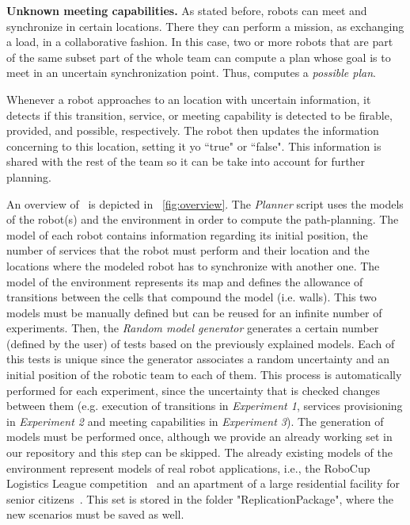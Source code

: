 \textbf{Unknown meeting capabilities.} 
As stated before, robots can meet and synchronize in certain locations.
There they can perform a mission, as exchanging a load, in a collaborative fashion.
In this case, two or more robots that are part of the same subset part of the whole team can compute a plan whose goal is to meet in an uncertain synchronization point.
Thus, \toolName computes a \emph{possible plan}.

Whenever a robot approaches to an location with uncertain information, it detects if this transition, service, or meeting capability is detected to be firable, provided, and possible, respectively.
The robot then updates the information concerning to this location, setting it yo ``true" or ``false".
This information is shared with the rest of the team so it can be take into account for further planning.

An overview of \toolName\ is depicted in ~\ref{fig:overview}.
The \emph{Planner} script uses the models of the robot(s) and the environment in order to compute the path-planning.
The model of each robot contains information regarding its initial position, the number of services that the robot must perform and their location and the locations where the modeled robot has to synchronize with another one.  
The model of the environment represents its map and defines the allowance of transitions between the cells that compound the model (i.e. walls). 
This two models must be manually defined but can be reused for an infinite number of experiments.
Then, the \emph{Random model generator} generates a certain number (defined by the user) of tests based on the previously explained models.
Each of this tests is unique since the generator associates a random uncertainty and an initial position of the robotic team to each of them.
This process is automatically performed for each experiment, since the uncertainty that is checked changes between them (e.g. execution of transitions in \emph{Experiment 1}, services provisioning in \emph{Experiment 2} and meeting capabilities in \emph{Experiment 3}).
The generation of models must be performed once, although we provide an already working set in our repository and this step can be skipped.
The already existing models of the environment represent models of real robot applications, i.e., the RoboCup Logistics League competition~\cite{karrasrobocup} and an apartment of a large residential facility for senior citizens~\cite{map}.
This set is stored in the folder "ReplicationPackage", where the new scenarios must be saved as well.

